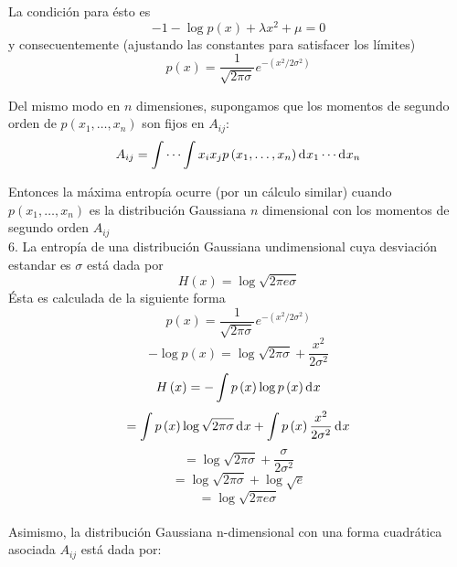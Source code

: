 La condici\'on para \'esto es
\begin{equation}
-1-\log p\left ( x \right )+\lambda x^{2}+\mu =0
\end{equation}
y consecuentemente (ajustando las constantes para satisfacer los l\'imites)
\begin{equation}
p\left ( x \right )=\frac{1}{\sqrt{2\pi \sigma }}e^{-\left ( x^{2}/2\sigma ^{2} \right )}
\end{equation}

Del mismo modo en $n$ dimensiones, supongamos que los momentos de
segundo orden de $p\left ( x_{1}, \ldots ,x_{n} \right )$ son fijos en
$A_{ij}$:
\begin{equation}
A_{ij}=\int \cdots \int x_{i}x_{j}p\left ( x_{1}, \ldots ,x_{n} \right ) \diff x _{1}\cdots  \diff x_{n}
\end{equation}

Entonces la m\'axima entrop\'ia ocurre (por un c\'alculo similar)
cuando $p\left ( x_{1}, \ldots ,x_{n} \right )$ es la distribuci\'on
Gaussiana $n$ dimensional con los momentos de segundo orden $A_{ij}$
\\
6. La entrop\'ia de una distribuci\'on Gaussiana undimensional cuya desviaci\'on estandar es $\sigma$ est\'a dada por
\begin{equation}
H\left ( x \right )=\log \sqrt{2\pi e\sigma }
\end{equation}
\'Esta es calculada de la siguiente forma
\begin{equation}
p\left ( x \right )=\frac{1}{\sqrt{2\pi \sigma }}e^{-\left ( x^{2}/2\sigma ^{2} \right )}
\end{equation}
\begin{equation}
-\log p\left ( x \right )=\log \sqrt{2\pi \sigma }+\frac{x^{2}}{2\sigma ^{2}}
\end{equation}
\begin{equation}
H\left ( x \right )=-\int p\left ( x \right )\log p\left ( x \right ) \diff x 
\end{equation}
\begin{equation}
=\int p\left ( x \right )\log \sqrt{2\pi \sigma } \diff x +\int p\left ( x \right )\frac{x^{2}}{2\sigma ^{2}} \diff x 
\end{equation}
\begin{equation}
=\log \sqrt{2\pi \sigma }+\frac{\sigma }{2\sigma ^{2}}
\end{equation}
\begin{equation}
=\log \sqrt{2\pi \sigma }+\log \sqrt{e}
\end{equation}
\begin{equation}
=\log \sqrt{2\pi e \sigma }
\end{equation}
\\
Asimismo, la distribuci\'on Gaussiana n-dimensional con una forma cuadr\'atica asociada $A_{ij}$ est\'a dada por:

